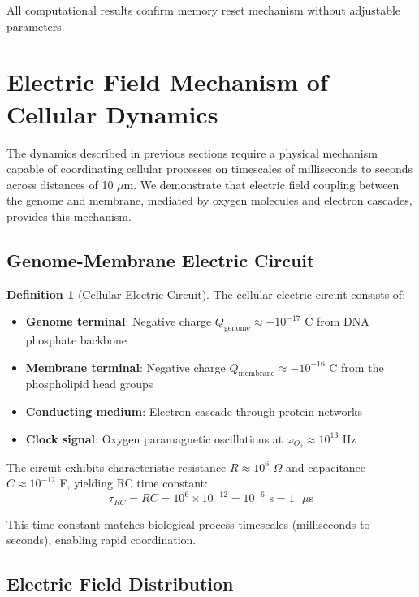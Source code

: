 \documentclass[11pt,twocolumn,a4paper]{article}
\theoremstyle{definition}
\newtheorem{definition}[theorem]{Definition}
\theoremstyle{remark}
\begin{document}
All computational results confirm memory reset mechanism without adjustable parameters.

\section{Electric Field Mechanism of Cellular Dynamics}
\label{sec:electric_field_mechanism}

The dynamics described in previous sections require a physical mechanism capable of coordinating cellular processes on timescales of milliseconds to seconds across distances of 10 $\mu$m. We demonstrate that electric field coupling between the genome and membrane, mediated by oxygen molecules and electron cascades, provides this mechanism.

\subsection{Genome-Membrane Electric Circuit}

\begin{definition}[Cellular Electric Circuit]
\label{def:cellular_circuit}
The cellular electric circuit consists of:
\begin{itemize}
  \item \textbf{Genome terminal}: Negative charge $Q_{\mathrm{genome}} \approx -10^{-17}$ C from DNA phosphate backbone
  \item \textbf{Membrane terminal}: Negative charge $Q_{\mathrm{membrane}} \approx -10^{-16}$ C from the phospholipid head groups
  \item \textbf{Conducting medium}: Electron cascade through protein networks
  \item \textbf{Clock signal}: Oxygen paramagnetic oscillations at $\omega_{O_2} \approx 10^{13}$ Hz
\end{itemize}
\end{definition}

The circuit exhibits characteristic resistance $R \approx 10^6$ $\Omega$ and capacitance $C \approx 10^{-12}$ F, yielding RC time constant:
\begin{equation}
\tau_{RC} = RC = 10^6 \times 10^{-12} = 10^{-6} \text{ s} = 1 \text{ $\mu$s}
\label{eq:rc_time_constant}
\end{equation}

This time constant matches biological process timescales (milliseconds to seconds), enabling rapid coordination.

\subsection{Electric Field Distribution}
\end{document}
